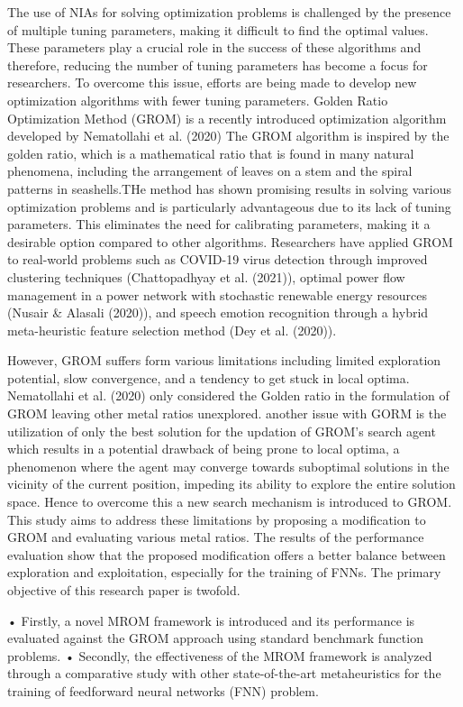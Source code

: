 The use of NIAs for solving optimization problems is challenged by the presence of multiple tuning parameters, making it difficult to find the optimal values. These parameters play a crucial role in the success of these algorithms and therefore, reducing the number of tuning parameters has become a focus for researchers. To overcome this issue, efforts are being made to develop new optimization algorithms with fewer tuning parameters. Golden Ratio Optimization Method (GROM) is a recently introduced optimization algorithm developed by Nematollahi et al. (2020) The GROM algorithm is inspired by the golden ratio, which is a mathematical ratio that is found in many natural phenomena, including the arrangement of leaves on a stem and the spiral patterns in seashells.THe method has shown promising results in solving various optimization problems and is particularly advantageous due to its lack of tuning parameters. This eliminates the need for calibrating parameters, making it a desirable option compared to other algorithms. Researchers have applied GROM to real-world problems such as COVID-19 virus detection through improved clustering techniques (Chattopadhyay et al. (2021)), optimal power flow management in a power network with stochastic renewable energy resources (Nusair \& Alasali (2020)), and speech emotion recognition through a hybrid meta-heuristic feature selection method (Dey et al. (2020)).

However, GROM suffers form various limitations including limited exploration potential, slow convergence, and a tendency to get stuck in local optima. Nematollahi et al. (2020) only considered the Golden ratio in the formulation of GROM leaving other metal ratios unexplored. another issue with GORM is the utilization of only the best solution for the updation of GROM’s search agent which results in a potential drawback of being prone to local optima, a phenomenon where the agent may converge towards suboptimal solutions in the vicinity of the current position, impeding its ability to explore the entire solution space. Hence to overcome this a new search mechanism is introduced to GROM. This study aims to address these limitations by proposing a modification to GROM and evaluating various metal ratios. The results of the performance evaluation show that the proposed modification offers a better balance between exploration and exploitation, especially for the training of FNNs. The primary objective of this research paper is twofold.

• Firstly, a novel MROM framework is introduced and its performance is evaluated against the GROM approach using standard benchmark function problems. • Secondly, the effectiveness of the MROM framework is analyzed through a comparative study with other state-of-the-art metaheuristics for the training of feedforward neural networks (FNN) problem.

